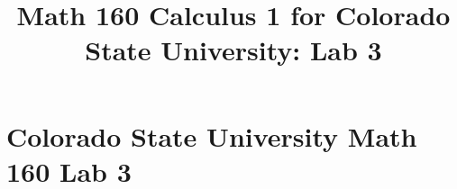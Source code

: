 \documentclass[10pt,handout,twocolumn,twoside,wordchoicegiven]{xourse}
\title{Math 160 Calculus 1 for Colorado State University: Lab 3}
\begin{document}
\maketitle

\setcounter{tocdepth}{2}


\part{Colorado State University Math 160 Lab 3}


\chapterstyle
\begin{graded}{0}
\end{graded}
\sectionstyle
\begin{graded}{29}
\end{graded}

%
%
%
%
\end{document}

